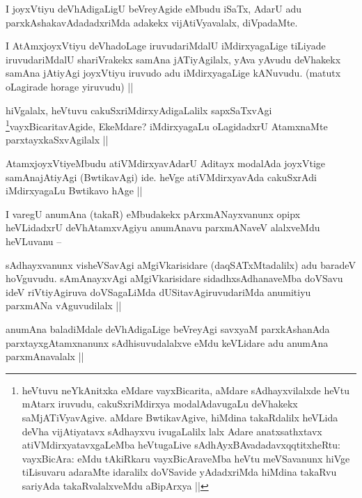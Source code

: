 \begin{artha}
I joyxVtiyu deVhAdigaLigU beVreyAgide eMbudu iSaTx, AdarU adu parxkAshakavAdadadxriMda adakekx vijAtiVyavalalx, diVpadaMte.
\end{artha}

\begin{artha}
I AtAmxjoyxVtiyu deVhadoLage iruvudariMdalU iMdirxyagaLige tiLiyade iruvudariMdalU shariVrakekx samAna jATiyAgilalx, yAva yAvudu deVhakekx samAna jAtiyAgi  joyxVtiyu iruvudo adu iMdirxyagaLige kANuvudu. (matutx oLagirade horage yiruvudu) ||
\end{artha}

\begin{artha}
hiVgalalx, heVtuvu cakuSxriMdirxyAdigaLalilx sapxSaTxvAgi \footnote{heVtuvu neYkAnitxka eMdare vayxBicarita, aMdare sAdhayxvilalxde heVtu mAtarx iruvudu, cakuSxriMdirxya modalAdavugaLu deVhakekx saMjATiVyavAgive. aMdare BwtikavAgive, hiMdina takaRdalilx heVLida deVha vijAtiyatavx sAdhayxvu ivugaLalilx lalx Adare anatxsathxtavx atiVMdirxyatavxgaLeMba heVtugaLive sAdhAyxBAvadadavxqqtitxheRtu: vayxBicAra: eMdu tAkiRkaru vayxBicAraveMba heVtu meVSavanunx hiVge tiLisuvaru adaraMte idaralilx doVSavide yAdadxriMda hiMdina takaRvu sariyAda takaRvalalxveMdu aBipArxya ||}vayxBicaritavAgide, EkeMdare? iMdirxyagaLu oLagidadxrU AtamxnaMte parxtayxkaSxvAgilalx ||
\end{artha}

\begin{artha}
AtamxjoyxVtiyeMbudu atiVMdirxyavAdarU Aditayx modalAda joyxVtige samAnajAtiyAgi (BwtikavAgi) ide. heVge atiVMdirxyavAda cakuSxrAdi iMdirxyagaLu Bwtikavo hAge ||

I varegU anumAna (takaR) eMbudakekx pArxmANayxvanunx opipx heVLidadxrU deVhAtamxvAgiyu anumAnavu parxmANaveV alalxveMdu heVLuvanu --
\end{artha}

\begin{artha}
sAdhayxvanunx visheVSavAgi aMgiVkarisidare (daqSATxMtadalilx) adu baradeV hoVguvudu. sAmAnayxvAgi aMgiVkarisidare sidadhxsAdhanaveMba doVSavu ideV riVtiyAgiruva doVSagaLiMda dUSitavAgiruvudariMda anumitiyu parxmANa vAguvudilalx ||
\end{artha}

\begin{artha}
anumAna baladiMdale deVhAdigaLige beVreyAgi savxyaM parxkAshanAda parxtayxgAtamxnanunx sAdhisuvudalalxve eMdu keVLidare adu anumAna parxmAnavalalx ||
\end{artha}

